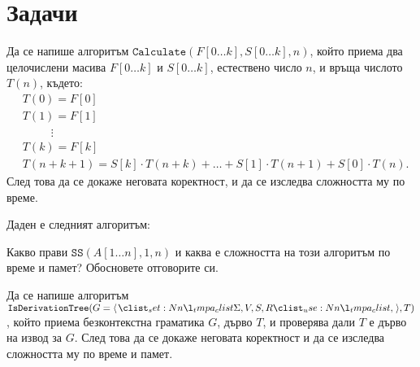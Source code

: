 \section{Задачи}

\begin{problem}
Да се напише алгоритъм $\mathtt{Calculate}(F[0 \dots k], S[0 \dots k], n)$, който приема два целочислени масива $F[0 \dots k]$ и $S[0 \dots k]$, естествено число $n$, и връща числото $T(n)$, където:
\begin{align*}
     & T(0) = F[0]                                                                         \\
     & T(1) = F[1]                                                                         \\
     & \phantom{00000} \vdots                                                              \\
     & T(k) = F[k]                                                                         \\
     & T(n + k + 1) = S[k] \cdot T(n + k) + \dots + S[1] \cdot T(n + 1) + S[0] \cdot T(n).
\end{align*}
След това да се докаже неговата коректност, и да се изследва сложността му по време.
\end{problem}

\newpage

\begin{problem}
Даден е следният алгоритъм:

Какво прави $\mathtt{SS}(A[1 \dots n], 1, n)$ и каква е сложността на този алгоритъм по време и памет?
Обосновете отговорите си.
\end{problem}

\begin{problem}
Да се напише алгоритъм $\mathtt{IsDerivationTree}(G = \opair{\Sigma, V, S, R}, T)$, който приема безконтекстна граматика $G$, дърво $T$, и проверява дали $T$ е дърво на извод за $G$.
След това да се докаже неговата коректност и да се изследва сложността му по време и памет.
\end{problem}
